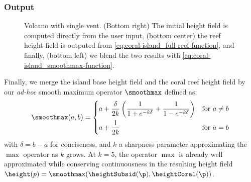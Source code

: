 \documentclass{egpubl}
\begin{document}


\subsubsection{Output}
\label{sec:coral-island_procedural-output}

\begin{figure}
    \caption{Volcano with single vent. (Bottom right) The initial height field is computed directly from the user input, (bottom center) the reef height field is outputed from \cref{eq:coral-island_full-reef-function}, and finally, (bottom left) we blend the two results with \cref{eq:coral-island_smoothmax-function}.}
    \label{fig:coral-island_volcano-example}
\end{figure}

Finally, we merge the island base height field and the coral reef height field by our \textit{ad-hoc} smooth maximum operator $\smoothmax$ defined as:
\begin{align}
    \label{eq:coral-island_smoothmax-function}
    \smoothmax(a, b) = \begin{dcases}
        a + \frac{\delta}{2k} \left( \frac{1}{1+e^{-k\delta}} + \frac{1}{1-e^{-k\delta}} \right) &\text{for } a \neq b \\
        a + \frac{1}{2k} &\text{for } a = b
    \end{dcases}
\end{align} 
with $\delta=b-a$ for conciseness, and $k$ a sharpness parameter approximating the $\max$ operator as $k$ grows. At $k=5$, the operator $\max$ is already well approximated while conserving continuousness in the resulting height field $\height(p) = \smoothmax(\heightSubsid(\p), \heightCoral(\p))$.
\end{document}
